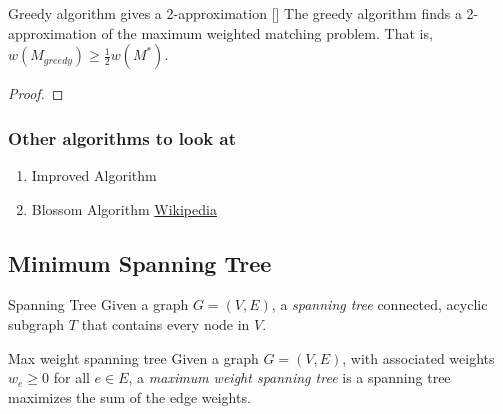 \begin{theorem}{Greedy algorithm gives a 2-approximation [\cite{Avis83}]}{}
The greedy algorithm finds a 2-approximation of the maximum weighted matching problem.  That is, $w(M_{greedy}) \geq \tfrac{1}{2} w(M^*)$.
\end{theorem}
\begin{proof}
\end{proof}

\subsubsection{Other algorithms to look at}
\begin{enumerate}
\item Improved  Algorithm \cite{DRAKE2003211}
\item Blossom Algorithm \href{https://en.wikipedia.org/wiki/Blossom_algorithm}{Wikipedia}
\end{enumerate}

\subsection{Minimum Spanning Tree}
\begin{definition}{Spanning Tree}{}
Given a graph $G = (V,E)$, a \emph{spanning tree} connected, acyclic subgraph $T$ that contains every node in $V$.
\end{definition}


\begin{definition}{Max weight spanning tree}{}
Given a graph $G = (V,E)$, with associated weights $w_e\geq 0$ for all $e \in E$, a \emph{maximum weight spanning tree} is a spanning tree maximizes the sum of the edge weights.
\end{definition}


